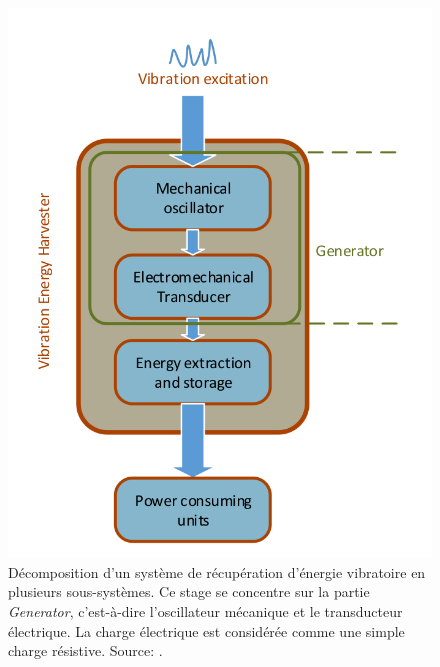 \documentclass[a4paper, french, 12pt, titlepage]{article}
\begin{document}
\begin{figure}[H]
  \begin{center}
    \includegraphics[width = .35\textwidth]{images/weiqun_lui_harvester}
  \end{center}
  \caption{Décomposition d'un système de récupération d'énergie vibratoire en plusieurs sous-systèmes.
    Ce stage se concentre sur la partie \textit{Generator}, c'est-à-dire l'oscillateur mécanique et le transducteur électrique.
    La charge électrique est considérée comme une simple charge résistive. Source:  \cite{Liu2014}.}
  \label{fig:wl_subsystems}
\end{figure}
\end{document}

